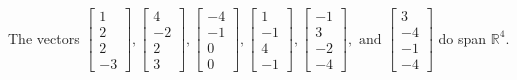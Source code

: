 \begin{exercise}
\begin{exerciseStatement}
  \end{exerciseStatement}
  \begin{exerciseAnswer}
   The vectors \(\left[\begin{array}{r}
1 \\
2 \\
2 \\
-3
\end{array}\right] , \left[\begin{array}{r}
4 \\
-2 \\
2 \\
3
\end{array}\right] , \left[\begin{array}{r}
-4 \\
-1 \\
0 \\
0
\end{array}\right] , \left[\begin{array}{r}
1 \\
-1 \\
4 \\
-1
\end{array}\right] , \left[\begin{array}{r}
-1 \\
3 \\
-2 \\
-4
\end{array}\right] , \text{ and } \left[\begin{array}{r}
3 \\
-4 \\
-1 \\
-4
\end{array}\right]\) 
  	 do  
	span \(\mathbb{R}^4\).
  


  \end{exerciseAnswer}
\end{exercise}